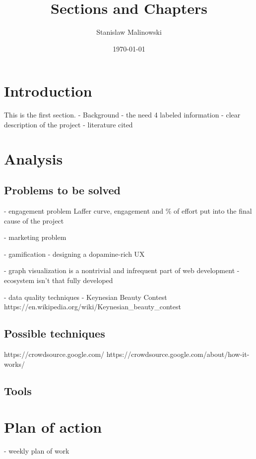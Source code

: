 \documentclass{article}
\title{Sections and Chapters}
\author{Stanislaw Malinowski}
\date{\today}
\begin{document}
\maketitle
\section{Introduction}

This is the first section.
- Background - the need 4 labeled information
- clear description of the project
- literature cited




\blindtext

\section{Analysis}
\subsection*{Problems to be solved}
- engagement problem
Laffer curve, engagement and \% of effort put into the final cause of the project

- marketing problem

- gamification - designing a dopamine-rich UX

- graph visualization is a nontrivial and infrequent part of web development - ecosystem isn't that fully developed

- data quality techniques - Keynesian Beauty Contest
https://en.wikipedia.org/wiki/Keynesian_beauty_contest


\subsection*{Possible techniques}
https://crowdsource.google.com/
https://crowdsource.google.com/about/how-it-works/

\subsection*{Tools}


\section{Plan of action}
- weekly plan of work
\blindtext
\end{document}
